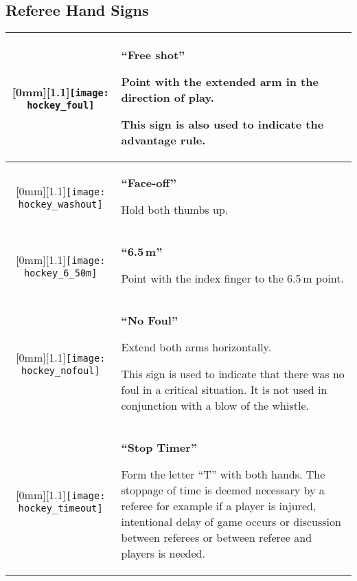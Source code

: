 \subsection{Referee Hand Signs}
\renewcommand{\arraystretch}{1.5}
\begin{longtable}{|c|p{10.8cm}|}

\hline %

\raisebox{-\height}[0mm][1.1\height]{\texttt{[image: hockey\_foul]}}
&
\textbf{``Free shot''}

Point with the extended arm in the direction of play.

This sign is also used to indicate the advantage rule.\\

\hline %

\raisebox{-\height}[0mm][1.1\height]{\texttt{[image: hockey\_washout]}}
&
\textbf{``Face-off''}

Hold both thumbs up.\\

\hline %

\raisebox{-\height}[0mm][1.1\height]{\texttt{[image: hockey\_6\_50m]}}
&
\textbf{``6.5\,m''}

Point with the index finger to the 6.5\,m point.\\

\hline %

\raisebox{-\height}[0mm][1.1\height]{\texttt{[image: hockey\_nofoul]}}
&
\textbf{``No Foul''}

Extend both arms horizontally.

This sign is used to indicate that there was no foul in a critical situation.
It is not used in conjunction with a blow of the whistle.\\

\hline %

\raisebox{-\height}[0mm][1.1\height]{\texttt{[image: hockey\_timeout]}}
&
\textbf{``Stop Timer''}

Form the letter ``T'' with both hands.
The stoppage of time is deemed necessary by a referee for example if a player is injured, intentional delay of game occurs or discussion between referees or between referee and players is needed.\\

\hline %


\end{longtable}
